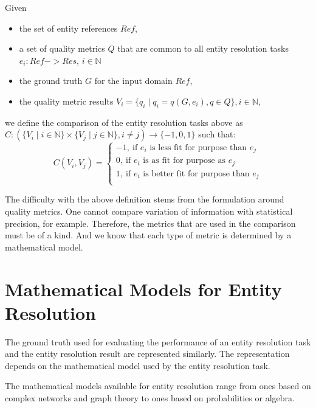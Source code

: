 \documentclass[lettersize,journal]{IEEEtran}
\begin{document}
    \begin{defn}
        Given
        \begin{itemize}
            \item the set of entity references $Ref$,
            \item a set of quality metrics $Q$ that are common to all
            entity resolution tasks $e_i : Ref -> Res$, $i \in \mathbb{N}$
            \item the ground truth $G$ for the input domain $Ref$,
            \item the quality metric results
            $V_i=\{q_{i} \mid q_{i} = q(G, e_i), q \in Q\}, i \in \mathbb{N}$,
        \end{itemize}   
        we define the comparison of the entity resolution tasks above as
        $C : (
            \{V_i \mid i \in \mathbb{N}\}
            \times
            \{V_j \mid j \in \mathbb{N}\},
            i \neq j
        ) \rightarrow \{-1, 0, 1\}$ such that:
        \[ 
C(V_i, V_j) = \left\{
\begin{array}{ll}
      -1,~\textrm{if $e_i$ is less fit for purpose than $e_j$}\\
      0,~\textrm{if $e_i$ is as fit for purpose as $e_j$}\\
      1,~\textrm{if $e_i$ is better fit for purpose than $e_j$}\\
\end{array} 
\right. 
\]

    \end{defn}

    The difficulty with the above definition stems from the formulation around
    quality metrics.
    One cannot compare variation of information with statistical precision, for
    example.
    Therefore, the metrics that are used in the comparison must be of a kind.
    And we know that each type of metric is determined by a mathematical model.
    
    \section[mm]{Mathematical Models for Entity Resolution}\label{sec:mm}

    The ground truth used for evaluating the performance of an entity resolution
    task and the entity resolution result are represented similarly.
    The representation depends on the mathematical model used by the entity
    resolution task.
    
    The mathematical models available for entity resolution range from ones
    based on complex networks and graph theory\cite{Li2020} to ones based on
    probabilities\cite{fs1969} or algebra\cite{Tal11,Ben2009Swoosh}.
\end{document}
